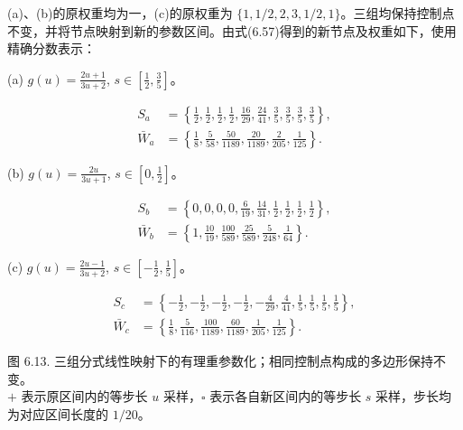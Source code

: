 \documentclass[../main.tex]{subfiles}
\begin{document}
(a)、(b)的原权重均为一，(c)的原权重为 $\{1,1/2,2,3,1/2,1\}$。三组均保持控制点不变，并将节点映射到新的参数区间。由式(6.57)得到的新节点及权重如下，使用精确分数表示：

(a) $g(u)=\frac{2u+1}{3u+2}$, $s\in[\frac{1}{2},\frac{3}{5}]$。

\[
\begin{aligned}
S_{a}&=\left\{\frac{1}{2},\frac{1}{2},\frac{1}{2},\frac{1}{2},\frac{16}{29},\frac{24}{41},\frac{3}{5},\frac{3}{5},\frac{3}{5},\frac{3}{5}\right\},\\
\bar W_{a}&=\left\{\frac{1}{8},\frac{5}{58},\frac{50}{1189},\frac{20}{1189},\frac{2}{205},\frac{1}{125}\right\}.
\end{aligned}
\]

(b) $g(u)=\frac{2u}{3u+1}$, $s\in[0,\frac{1}{2}]$。

\[
\begin{aligned}
S_{b}&=\left\{0,0,0,0,\frac{6}{19},\frac{14}{31},\frac{1}{2},\frac{1}{2},\frac{1}{2},\frac{1}{2}\right\},\\
\bar W_{b}&=\left\{1,\frac{10}{19},\frac{100}{589},\frac{25}{589},\frac{5}{248},\frac{1}{64}\right\}.
\end{aligned}
\]

(c) $g(u)=\frac{2u-1}{3u+2}$, $s\in[-\frac{1}{2},\frac{1}{5}]$。

\[
\begin{aligned}
S_{c}&=\left\{-\frac{1}{2},-\frac{1}{2},-\frac{1}{2},-\frac{1}{2},-\frac{4}{29},\frac{4}{41},\frac{1}{5},\frac{1}{5},\frac{1}{5},\frac{1}{5}\right\},\\
\bar W_{c}&=\left\{\frac{1}{8},\frac{5}{116},\frac{100}{1189},\frac{60}{1189},\frac{1}{205},\frac{1}{125}\right\}.
\end{aligned}
\]

\begin{center}
\begin{minipage}{37cm}
\vspace*{.6\baselineskip}
\centering
\begin{minipage}[c]{12cm}
\centering
{}
\end{minipage}\hspace{.6cm}
\begin{minipage}[c]{24cm}
\centering
{}
\end{minipage}
\par\smallskip
图 6.13. 三组分式线性映射下的有理重参数化；相同控制点构成的多边形保持不变。\\
$+$ 表示原区间内的等步长 $u$ 采样，$\square$ 表示各自新区间内的等步长 $s$ 采样，步长均为对应区间长度的 $1/20$。
\end{minipage}
\end{center}
\end{document}
